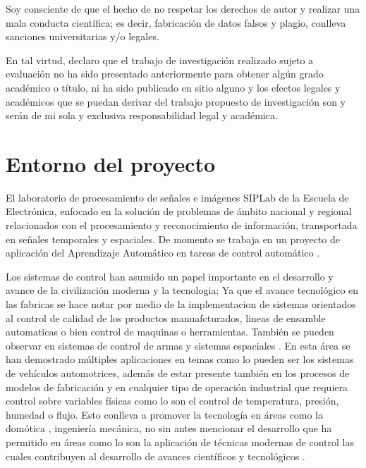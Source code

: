 \documentclass[12pt]{article}
\begin{document}
Soy consciente de que el hecho de no respetar los derechos de autor y realizar una mala conducta científica; es decir, fabricación de datos falsos y plagio, conlleva
sanciones universitarias y/o legales.

En tal virtud, declaro que el trabajo de investigación realizado sujeto a evaluación no ha sido presentado anteriormente para obtener algún grado académico o título, ni ha sido publicado en sitio alguno y los efectos legales y académicos que se puedan derivar del trabajo propuesto de investigación son y serán de mi sola y exclusiva responsabilidad legal y académica.

\newpage
\tableofcontents

\newpage

\section{Entorno del proyecto}

El laboratorio de procesamiento de señales e imágenes SIPLab de la Escuela de Electrónica, enfocado en la solución de problemas de ámbito nacional y regional relacionados con el procesamiento y reconocimiento de información, transportada en señales temporales y espaciales. De momento se trabaja en un proyecto de aplicación del Aprendizaje Automático en tareas de control automático  \cite{SIPLab} \cite{13_se}.

Los sistemas de control han asumido un papel importante en el desarrollo y avance de la civilización moderna y la tecnologia\cite{Elescano}; Ya que el avance tecnológico en las fabricas se hace notar por medio de la implementacion de sistemas orientados al control de calidad de los productos manuafcturados, lineas de ensamble automaticas o bien control de maquinas o herramientas. También se pueden observar en sistemas de control de armas y sistemas espaciales \cite{kuo1996sistemas}. En esta área se han demostrado múltiples aplicaciones en temas como lo pueden ser los sistemas de vehículos automotrices, además de estar presente también en los procesos de modelos de fabricación y en cualquier tipo de operación industrial que requiera control sobre variables físicas como lo son el control de temperatura, presión, humedad o flujo. Esto conlleva a promover la tecnología en áreas como la domótica , ingeniería mecánica, no sin antes mencionar el desarrollo que ha permitido en áreas como lo son la aplicación de técnicas modernas de control las cuales contribuyen al desarrollo de avances científicos y tecnológicos \cite{Corvacho} \cite{Perez}.
\end{document}
